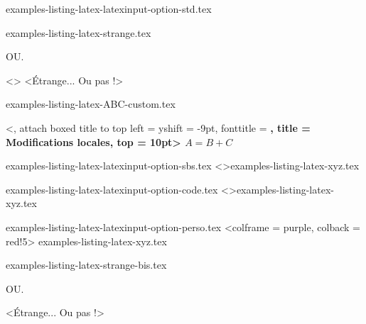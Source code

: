 \begin{filecontents*}[overwrite]{examples-listing-latex-latexinput-option-std.tex}
\end{filecontents*}


\begin{filecontents*}[overwrite]{examples-listing-latex-strange.tex}
\begin{tdoclatex}
\end{tdoclatex}
OU.
\begin{tdoclatex}<>
<Étrange... Ou pas !>
\end{tdoclatex}
\end{filecontents*}


\begin{filecontents*}[overwrite]{examples-listing-latex-ABC-custom.tex}
\begin{tdoclatex}%
    [linenos, style = igor, showspaces]%
    <,
     attach boxed title to top left = {yshift = -9pt},
     fonttitle                      = \bfseries,
     title                          = Modifications locales,
     top                            = 10pt>
$A = B + C$
\end{tdoclatex}
\end{filecontents*}


\begin{filecontents*}[overwrite]{examples-listing-latex-latexinput-option-sbs.tex}
\tdoclatexinput<>{examples-listing-latex-xyz.tex}
\end{filecontents*}


\begin{filecontents*}[overwrite]{examples-listing-latex-latexinput-option-code.tex}
\tdoclatexinput<>{examples-listing-latex-xyz.tex}
\end{filecontents*}


\begin{filecontents*}[overwrite]{examples-listing-latex-latexinput-option-perso.tex}
\tdoclatexinput[style = igor, showspaces]%
               <colframe = purple, colback = red!5>%
               {examples-listing-latex-xyz.tex}
\end{filecontents*}


\begin{filecontents*}[overwrite]{examples-listing-latex-strange-bis.tex}
\begin{tdoclatex}
\end{tdoclatex}
OU.
\begin{tdoclatex}
\string<Étrange... Ou pas !>
\end{tdoclatex}
\end{filecontents*}


